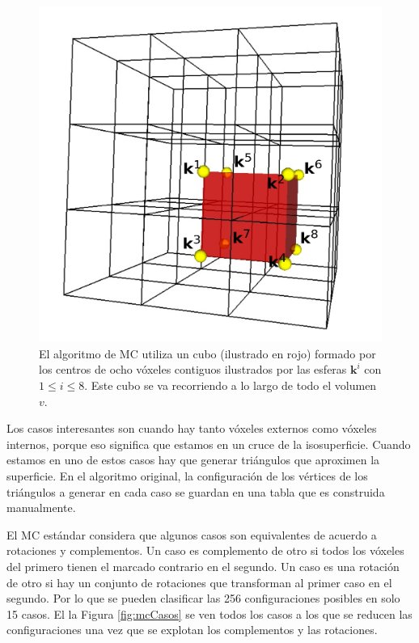 \begin{figure}[htp]
 \centering
  \includegraphics[scale=0.5]{img/cap01/mcCube}
  \caption[El algoritmo de MC utiliza un cubo formado con los centros de ocho vóxeles contiguos para recorrer el volumen]{El algoritmo de MC utiliza un cubo (ilustrado en rojo) formado por los centros de ocho vóxeles contiguos ilustrados por las esferas $\textbf{k}^{i}$ con $1 \leq i \leq 8$. Este cubo se va recorriendo a lo largo de todo el volumen $v$.}
  \label{fig:barridoCubo}
\end{figure}

Los casos interesantes son cuando hay tanto vóxeles externos como vóxeles internos, porque eso significa que estamos en un cruce de la isosuperficie. Cuando estamos en uno de estos casos hay que generar triángulos que aproximen la superficie. En el algoritmo original, la configuración de los vértices de los triángulos a generar en cada caso se guardan en una tabla que es construida manualmente.

El MC estándar considera que algunos casos son equivalentes de acuerdo a rotaciones y complementos. Un caso es complemento de otro si todos los vóxeles del primero tienen el marcado contrario en el segundo. Un caso es una rotación de otro si hay un conjunto de rotaciones que transforman al primer caso en el segundo. Por lo que se pueden clasificar las 256 configuraciones posibles en solo 15 casos. El la Figura \ref{fig:mcCasos} se ven todos los casos a los que se reducen las configuraciones una vez que se explotan los complementos y las rotaciones.

